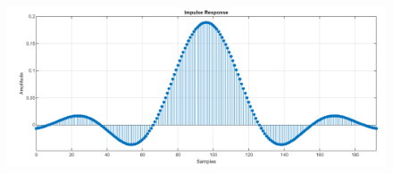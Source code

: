 


\vspace{3mm}

    \begin{figure}[h]
    	\centering
    	\includegraphics[width=1\textwidth]{img/matlab/rrc.PNG}
    	\caption{}
    	\label{fig:rrc}
    \end{figure}
    
\vspace{3mm}



